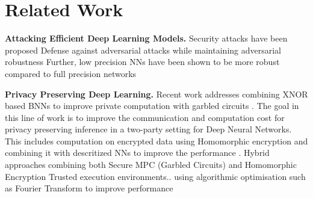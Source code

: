 \section{Related Work}

\textbf{Attacking Efficient Deep Learning Models.} Security attacks have been proposed \cite{khalil2018combinatorial}
Defense against adversarial attacks while maintaining adversarial robustness \cite{lin2018defensive}
Further, low precision NNs have been shown to be more robust compared to full precision networks \cite{8723317}\cite{galloway2018attacking}



\textbf{Privacy Preserving Deep Learning.} Recent work addresses combining XNOR based BNNs to improve private computation with garbled circuits \cite{235489} \cite{8824120}.
The goal in this line of work is to improve the communication and computation cost for privacy preserving inference in a two-party setting for Deep Neural Networks.
This includes computation on encrypted data using Homomorphic encryption and combining it with descritized NNs to improve the performance \cite{Bourse2017FastHE}.
Hybrid approaches combining both Secure MPC (Garbled Circuits) and Homomorphic Encryption \cite{217515}
Trusted execution environments..
using algorithmic optimisation such as Fourier Transform to improve performance \cite{Li2018FALCONAF}


